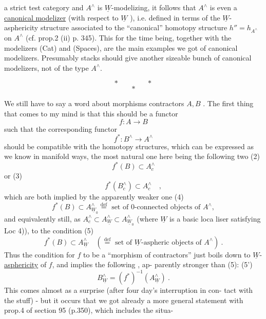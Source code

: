
a strict test category and $A^\wedge$ is $\underline{W}$-modelizing,  it follows that $A^\wedge$ is
even a \uline{canonical modelizer} (with respect to $\underline{W}$ ), i.e.  defined in
terms of the $\underline{W}$-asphericity structure associated to the ``canonical''
homotopy structure $h'' = h_{A^\wedge}$ on $A^\wedge$ (cf. prop.2  (ii)  p. 345).  This
for the time being,  together with the modelizers (Cat) and (Spaces),
are the main examples we got of canonical modelizers.  Presumably
stacks should give another sizeable bunch of canonical modelizers,
not of the type $A^\wedge$.

\[ * \qquad\qquad * \]
\[ * \]

We still have to say a word about morphisms   contractors $A,B$ .
The first thing that comes to my mind is that this should be a functor
 \[ f\colon A \longrightarrow B \]
such that the corresponding functor
 \[ f^*\colon B^\wedge \longrightarrow A^\wedge \]
should be compatible with the homotopy structures,  which can be
expressed\hand{,} as we know\hand{,} in manifold ways,  the most natural one here
being the following two
(2) \[ f^*(B) \subset A^\wedge_c \]
or
(3) \[ f^*(B^\wedge_c) \subset A^\wedge_c \quad , \]
which are both implied by the apparently weaker one
(4) \[ f^*(B) \subset A^\wedge_{\underline{W}_0} \overset{\text{def}}{=} \text{ set of 0-connected objects of } A^\wedge, \]
and equivalently still,  as $A^\wedge_c \subset A^\wedge_{\underline{W}} \subset A^\wedge_{\underline{W}_0}$   (where $\underline{W}$  is a basic loca
liser satisfying Loc 4)),  to the condition
(5) \[ f^*(B) \subset A^\wedge_{\underline{W}} \quad (\overset{\text{def}}{=} \text{ set of } \underline{W}\text{-aspheric objects of } A^\wedge) \ . \]
Thus the condition for $f$ to be a ``morphism of contractors'' just boils
down to  $\underline{W}$-\uline{asphericity} of $f$,  and implies the following  ,  ap-%
parently stronger than (5):
(5') \[ B^\wedge_{\underline{W}} = (f^*)^{-1}(A^\wedge_{\underline{W}}) \ . \]
This comes almost as a surprise (after  four day's  interruption in con-%
tact with the stuff\hand{!}) - but it occurs  that we got already a more general
statement with prop.4 of section 95 (p.350),  which includes the situa-%

